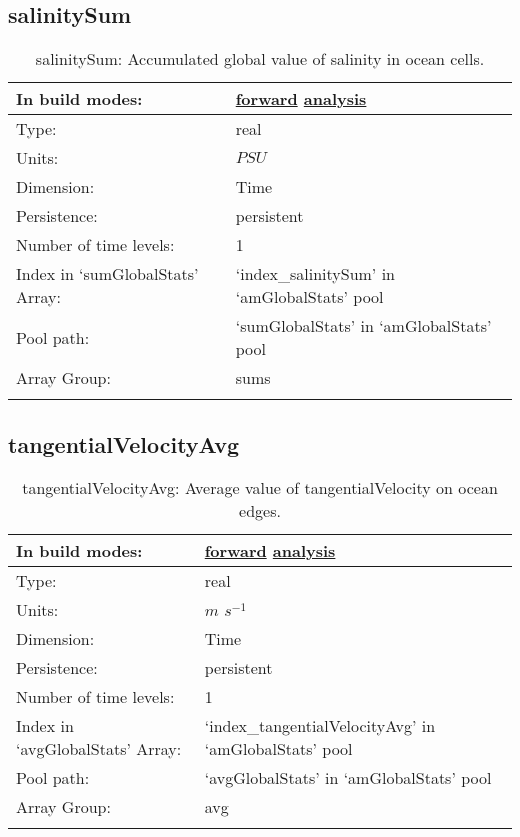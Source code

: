 \subsection[salinitySum]{salinitySum}
\label{subsec:var_sec_amGlobalStats_salinitySum}
\begin{center}
\begin{longtable}{| p{2.0in} | p{4.0in} |}
        \hline 
        In build modes: & \hyperref[subsec:forward_var_tab_amGlobalStats]{forward} \hyperref[subsec:analysis_var_tab_amGlobalStats]{analysis} \\
        \hline 
        Type: & real \\
        \hline 
        Units: & $PSU$ \\
        \hline 
        Dimension: & Time \\
        \hline 
        Persistence: & persistent \\
        \hline 
        Number of time levels: & 1 \\
        \hline 
		 Index in `sumGlobalStats' Array: & `index\_salinitySum' in `amGlobalStats' pool \\
		 \hline 
            Pool path: & `sumGlobalStats' in `amGlobalStats' pool \\
		 \hline 
		 Array Group: & sums \\
		 \hline 
    \caption{salinitySum: Accumulated global value of salinity in ocean cells.}
\end{longtable}
\end{center}
\subsection[tangentialVelocityAvg]{tangentialVelocityAvg}
\label{subsec:var_sec_amGlobalStats_tangentialVelocityAvg}
\begin{center}
\begin{longtable}{| p{2.0in} | p{4.0in} |}
        \hline 
        In build modes: & \hyperref[subsec:forward_var_tab_amGlobalStats]{forward} \hyperref[subsec:analysis_var_tab_amGlobalStats]{analysis} \\
        \hline 
        Type: & real \\
        \hline 
        Units: & $m$ $s^{-1}$ \\
        \hline 
        Dimension: & Time \\
        \hline 
        Persistence: & persistent \\
        \hline 
        Number of time levels: & 1 \\
        \hline 
		 Index in `avgGlobalStats' Array: & `index\_tangentialVelocityAvg' in `amGlobalStats' pool \\
		 \hline 
            Pool path: & `avgGlobalStats' in `amGlobalStats' pool \\
		 \hline 
		 Array Group: & avg \\
		 \hline 
    \caption{tangentialVelocityAvg: Average value of tangentialVelocity on ocean edges.}
\end{longtable}
\end{center}
